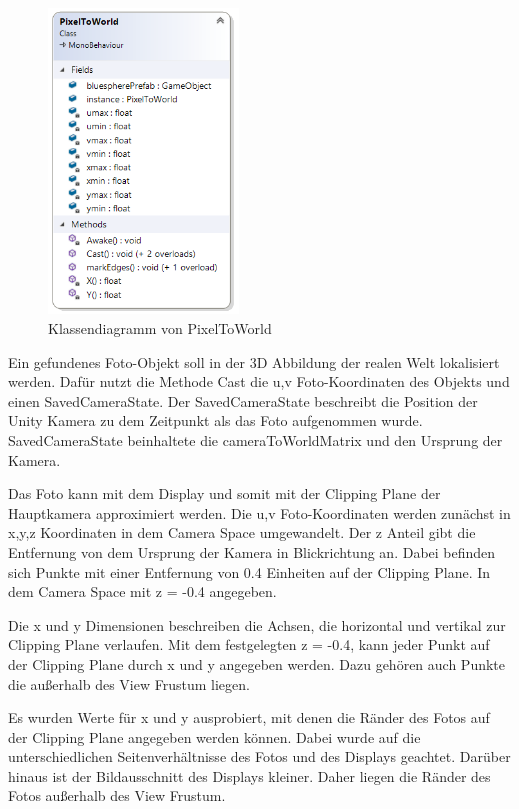 \begin{figure}[H]
	\centering
	\includegraphics[width=0.45\textwidth]{images/dia_pixeltoworld.PNG}
	\caption[Klassendiagramm von PixelToWorld]{Klassendiagramm von PixelToWorld}
	\label{dia:pixeltoworld}
\end{figure}

Ein gefundenes Foto-Objekt soll in der 3D Abbildung der realen Welt lokalisiert werden. Dafür nutzt die Methode Cast die u,v Foto-Koordinaten des Objekts und einen SavedCameraState. Der SavedCameraState beschreibt die Position der Unity Kamera zu dem Zeitpunkt als das Foto aufgenommen wurde. SavedCameraState beinhaltete die cameraToWorldMatrix und den Ursprung der Kamera.

Das Foto kann mit dem Display und somit mit der Clipping Plane der Hauptkamera approximiert werden.
Die u,v Foto-Koordinaten werden zunächst in x,y,z Koordinaten in dem Camera Space umgewandelt. Der z Anteil gibt die Entfernung von dem Ursprung der Kamera in Blickrichtung an. Dabei befinden sich Punkte mit einer Entfernung von 0.4 Einheiten auf der Clipping Plane. In dem Camera Space mit z = -0.4 angegeben. 

Die x und y Dimensionen beschreiben die Achsen, die horizontal und vertikal zur Clipping Plane verlaufen. Mit dem festgelegten z = -0.4, kann jeder Punkt auf der Clipping Plane durch x und y angegeben werden. Dazu gehören auch Punkte die außerhalb des View Frustum liegen.

Es wurden Werte für x und y ausprobiert, mit denen die Ränder des Fotos auf der Clipping Plane angegeben werden können. Dabei wurde auf die unterschiedlichen Seitenverhältnisse des Fotos und des Displays geachtet. Darüber hinaus ist der Bildausschnitt des Displays kleiner. Daher liegen die Ränder des Fotos außerhalb des View Frustum. 


